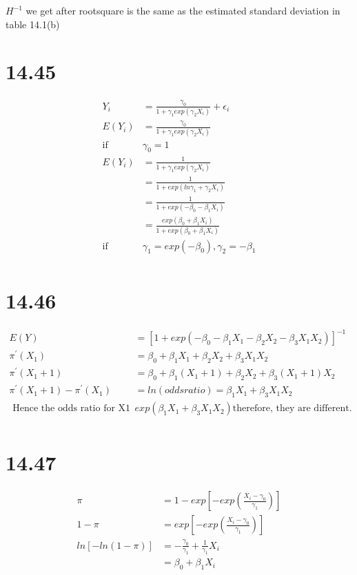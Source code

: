 \documentclass{article}\usepackage[]{graphicx}\usepackage[]{color}
\begin{document}
\qquad $H^{-1}$ we get after rootsquare is the same as the estimated standard deviation in table 14.1(b)

\section{14.45}

\begin{displaymath}
\begin{split}
  Y_i &= \frac{\gamma_0}{1 + \gamma_1 exp(\gamma_2 X_i)} + \epsilon_i \\
  E(Y_i) &= \frac{\gamma_0}{1 + \gamma_1 exp(\gamma_2 X_i)} \\
  \text{if} &\gamma_0 = 1 \\
  E(Y_i) &= \frac{1}{1 + \gamma_1 exp(\gamma_2 X_i)} \\
         &= \frac{1}{1 + exp(ln\gamma_1 + \gamma_2 X_i)} \\
         &= \frac{1}{1 + exp(-\beta_0 - \beta_1 X_i)} \\
         &= \frac{exp(\beta_0 + \beta_1 X_i)}{1+exp(\beta_0 + \beta_1 X_i)}\\
  \text{if} &\gamma_1 = exp(-\beta_0) , \gamma_2 = -\beta_1\\       
\end{split}
\end{displaymath}

\section{14.46}

\begin{displaymath}
\begin{split}
  E(Y) &= [1 + exp(-\beta_0-\beta_1 X_1 - \beta_2 X_2 - \beta_3 X_1 X_2)]^{-1} \\
  \pi^{'}(X_1)  &= \beta_0 + \beta_1 X_1 + \beta_2 X_2 + \beta_3 X_1 X_2 \\
  \pi^{'}(X_1 + 1)  &= \beta_0 + \beta_1 (X_1 + 1) + \beta_2 X_2 + \beta_3 (X_1 + 1) X_2 \\ 
  \pi^{'}(X_1 + 1) - \pi^{'}(X_1) &= ln(odds ratio) = \beta_1 X_1 + \beta_3 X_1 X_2\\
  \text{ Hence the odds ratio for X1 is } & exp(\beta_1 X_1 + \beta_3 X_1 X_2) \text{therefore, they are different.} \\
\end{split}
\end{displaymath}

\section{14.47}

\begin{displaymath}
\begin{split}
  \pi &= 1 - exp[-exp(\frac{X_i-\gamma_0}{\gamma_1})] \\
  1 - \pi &= exp[-exp(\frac{X_i-\gamma_0}{\gamma_1})] \\
  ln[-ln(1-\pi)] &= -\frac{\gamma_0}{\gamma_1} + \frac{1}{\gamma_1} X_i\\
                 &= \beta_0 + \beta_1 X_i  
\end{split}
\end{displaymath}
\end{document}

